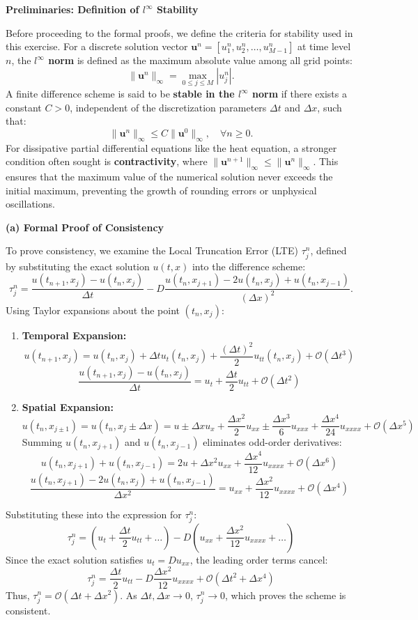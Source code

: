 \begin{solution}
\textbf{Preliminaries: Definition of $l^\infty$ Stability}

Before proceeding to the formal proofs, we define the criteria for stability used in this exercise. For a discrete solution vector $\mathbf{u}^n = [u_1^n, u_2^n, \dots, u_{M-1}^n]$ at time level $n$, the \textbf{$l^\infty$ norm} is defined as the maximum absolute value among all grid points:
\[ \|\mathbf{u}^n\|_\infty = \max_{0 \leq j \leq M} |u_j^n|. \]
A finite difference scheme is said to be \textbf{stable in the $l^\infty$ norm} if there exists a constant $C > 0$, independent of the discretization parameters $\Delta t$ and $\Delta x$, such that:
\[ \|\mathbf{u}^n\|_\infty \leq C \|\mathbf{u}^0\|_\infty, \quad \forall n \geq 0. \]
For dissipative partial differential equations like the heat equation, a stronger condition often sought is \textbf{contractivity}, where $\|\mathbf{u}^{n+1}\|_\infty \leq \|\mathbf{u}^n\|_\infty$. This ensures that the maximum value of the numerical solution never exceeds the initial maximum, preventing the growth of rounding errors or unphysical oscillations.

\textbf{(a) Formal Proof of Consistency}

To prove consistency, we examine the Local Truncation Error (LTE) $\tau_j^n$, defined by substituting the exact solution $u(t, x)$ into the difference scheme:
\[ \tau_j^n = \frac{u(t_{n+1}, x_j) - u(t_n, x_j)}{\Delta t} - D \frac{u(t_n, x_{j+1}) - 2u(t_n, x_j) + u(t_n, x_{j-1})}{(\Delta x)^2}. \]
Using Taylor expansions about the point $(t_n, x_j)$:
\begin{enumerate}
    \item \textbf{Temporal Expansion:}
    \[ u(t_{n+1}, x_j) = u(t_n, x_j) + \Delta t u_t(t_n, x_j) + \frac{(\Delta t)^2}{2} u_{tt}(t_n, x_j) + \mathcal{O}(\Delta t^3) \]
    \[ \frac{u(t_{n+1}, x_j) - u(t_n, x_j)}{\Delta t} = u_t + \frac{\Delta t}{2} u_{tt} + \mathcal{O}(\Delta t^2) \]
    \item \textbf{Spatial Expansion:}
    \[ u(t_n, x_{j\pm 1}) = u(t_n, x_j \pm \Delta x) = u \pm \Delta x u_x + \frac{\Delta x^2}{2} u_{xx} \pm \frac{\Delta x^3}{6} u_{xxx} + \frac{\Delta x^4}{24} u_{xxxx} + \mathcal{O}(\Delta x^5) \]
    Summing $u(t_n, x_{j+1})$ and $u(t_n, x_{j-1})$ eliminates odd-order derivatives:
    \[ u(t_n, x_{j+1}) + u(t_n, x_{j-1}) = 2u + \Delta x^2 u_{xx} + \frac{\Delta x^4}{12} u_{xxxx} + \mathcal{O}(\Delta x^6) \]
    \[ \frac{u(t_n, x_{j+1}) - 2u(t_n, x_j) + u(t_n, x_{j-1})}{\Delta x^2} = u_{xx} + \frac{\Delta x^2}{12} u_{xxxx} + \mathcal{O}(\Delta x^4) \]
\end{enumerate}
Substituting these into the expression for $\tau_j^n$:
\[ \tau_j^n = \left( u_t + \frac{\Delta t}{2} u_{tt} + \dots \right) - D \left( u_{xx} + \frac{\Delta x^2}{12} u_{xxxx} + \dots \right) \]
Since the exact solution satisfies $u_t = D u_{xx}$, the leading order terms cancel:
\[ \tau_j^n = \frac{\Delta t}{2} u_{tt} - D \frac{\Delta x^2}{12} u_{xxxx} + \mathcal{O}(\Delta t^2 + \Delta x^4) \]
Thus, $\tau_j^n = \mathcal{O}(\Delta t + \Delta x^2)$. As $\Delta t, \Delta x \to 0$, $\tau_j^n \to 0$, which proves the scheme is consistent.


\end{solution}
